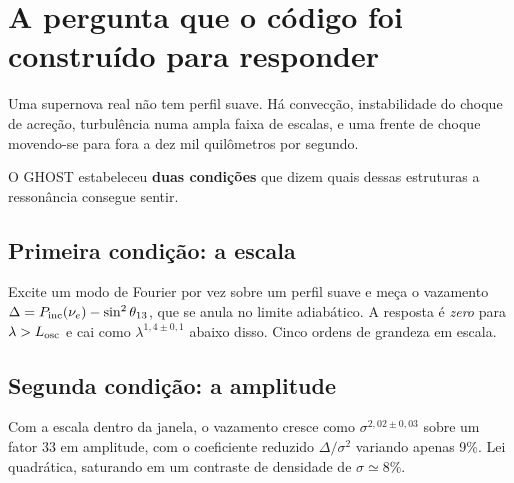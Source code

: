 \section{A pergunta que o código foi construído para responder}

Uma supernova real não tem perfil suave. Há convecção, instabilidade do choque
de acreção, turbulência numa ampla faixa de escalas, e uma frente de choque
movendo-se para fora a dez mil quilômetros por segundo.

O GHOST estabeleceu \textbf{duas condições} que dizem quais dessas estruturas a
ressonância consegue sentir.

\subsection{Primeira condição: a escala}

Excite um modo de Fourier por vez sobre um perfil suave e meça o vazamento
$\Delta = P_{\rm inc}(\nu_e) - \sin^2\theta_{13}$, que se anula no limite
adiabático. A resposta é \emph{zero} para $\lambda > L_{\text{osc}}$ e cai como
$\lambda^{1{,}4\pm0{,}1}$ abaixo disso. Cinco ordens de grandeza em escala.

\subsection{Segunda condição: a amplitude}

Com a escala dentro da janela, o vazamento cresce como $\sigma^{2{,}02\pm0{,}03}$
sobre um fator 33 em amplitude, com o coeficiente reduzido $\Delta/\sigma^2$
variando apenas 9\%. Lei quadrática, saturando em um contraste de densidade de
$\sigma \simeq 8\%$.

